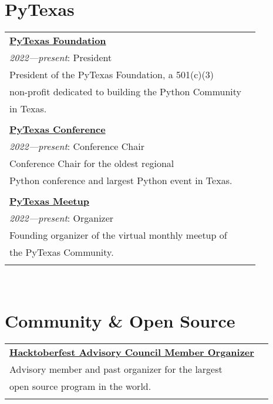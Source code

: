 \documentclass[10pt]{article} %
\newcommand\tab[1][1cm]{\hspace*{#1}}
\begin{document}
\begin{minipage}[t]{0.44\textwidth}
\section{PyTexas}

\begin{tabular}{ll}
\textbf{\href{https://pytexas.org}{PyTexas Foundation}}\\
\tab\textit{2022—present}: President\\
\tab President of the PyTexas Foundation, a 501(c)(3)    \\
\tab non-profit dedicated to building the Python Community \\
\tab in Texas. \\
\\

\textbf{\href{https://pytexas.org/2024}{PyTexas Conference}}\\
\tab\textit{2022—present}: Conference  Chair\\
\tab Conference Chair for the oldest regional   \\
\tab Python conference and largest Python event in Texas. \\
\\

\textbf{\href{https://pytexas.org/meetup}{PyTexas Meetup}}\\
\tab\textit{2022—present}: Organizer\\
\tab Founding organizer of the virtual monthly meetup of   \\
\tab the PyTexas Community. \\
\\

\end{tabular}\\

\section{Community \& Open Source}

\begin{tabular}{ll}
\textbf{\href{https://hacktoberfest.digitalocean.com/}{Hacktoberfest  Advisory Council Member Organizer}}\\
\tab Advisory member and past organizer for the largest  \\
\tab open source program in the world. \\ 
\\


\end{tabular}
\end{minipage}
\end{document}
